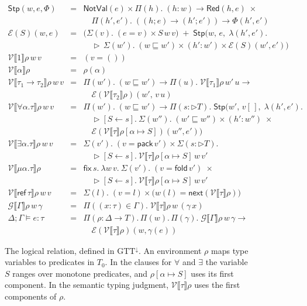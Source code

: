 \documentclass[acmsmall,nonacm,screen]{acmart}
\newcommand{\later}{{\triangleright}}
\newcommand{\nxt}{\mathsf{next}}
\newcommand{\fix}{\mathsf{fix}}
\newcommand{\sem}[1]{\llbracket #1 \rrbracket}
\newcommand{\kw}[1]{\mathsf{#1}}
\newcommand{\dsub}[2]{[#1 \leftarrow #2]}
\newcommand{\Pred}{T}
\newcommand{\Stp}{\mathsf{Stp}}
\newcommand{\Er}{\mathcal{E}}
\newcommand{\Vr}{\mathcal{V}}
\newcommand{\Gr}{\mathcal{G}}
\newcommand{\ext}{\sqsubseteq}
\begin{document}
\begin{figure}
\small
\[
\begin{array}{rcl}
\Stp(w,e,\Phi) & = & \kw{NotVal}(e) \times \Pi(h).\; (h : w) \to \kw{Red}(h,e) \;\times \\
 & & \quad \Pi(h',e').\; ((h;e) \longrightarrow (h';e')) \to \Phi(h',e') \\[4pt]
\Er(S)(w,e) & = & \bigl(\Sigma(v).\; (e = v) \times S\,w\,v\bigr) \;+\; \Stp\bigl(w,\,e,\;\lambda(h',e'). \\
 & & \quad \later\,\Sigma(w').\; (w \ext w') \times (h' : w') \times \Er(S)(w',e')\bigr) \\[6pt]
\Vr\sem{1}\rho\,w\,v & = & (v = ()) \\
\Vr\sem{\alpha}\rho & = & \rho(\alpha) \\
\Vr\sem{\tau_1 \to \tau_2}\rho\,w\,v & = &
   \Pi(w').\; (w \ext w') \to \Pi(u).\; \Vr\sem{\tau_1}\rho\,w'\,u \to \\
 & & \quad \Er(\Vr\sem{\tau_2}\rho)(w',\,v\,u) \\
\Vr\sem{\forall\alpha.\tau}\rho\,w\,v & = &
   \Pi(w').\; (w \ext w') \to \Pi(s : \later\Pred).\; \Stp\bigl(w',\,v[\,],\;\lambda(h',e'). \\
 & & \quad \later\dsub{S}{s}.\ \Sigma(w'').\; (w' \ext w'') \times (h' : w'') \;\times \\
 & & \quad \Er(\Vr\sem{\tau}\rho[\alpha \mapsto S])(w'',e')\bigr) \\
\Vr\sem{\exists\alpha.\tau}\rho\,w\,v & = &
   \Sigma(v').\; (v = \kw{pack}\,v') \times \Sigma(s : \later\Pred). \\
 & & \quad \later\dsub{S}{s}.\ \Vr\sem{\tau}\rho[\alpha \mapsto S]\,w\,v' \\
\Vr\sem{\mu\alpha.\tau}\rho & = &
   \fix\,s.\ \lambda w\,v.\ \Sigma(v').\; (v = \kw{fold}\,v') \;\times \\
 & & \quad \later\dsub{S}{s}.\ \Vr\sem{\tau}\rho[\alpha \mapsto S]\,w\,v' \\
\Vr\sem{\kw{ref}\,\tau}\rho\,w\,v & = &
   \Sigma(l).\; (v = l) \times \bigl(w(l) = \nxt(\Vr\sem{\tau}\rho)\bigr) \\[6pt]
\Gr\sem{\Gamma}\rho\,w\,\gamma & = & \Pi((x{:}\tau) \in \Gamma).\; \Vr\sem{\tau}\rho\,w\,(\gamma\,x) \\
\Delta;\Gamma \vDash e : \tau & = &
   \Pi(\rho : \Delta \to \Pred).\,\Pi(w).\,\Pi(\gamma).\; \Gr\sem{\Gamma}\rho\,w\,\gamma \to \\
 & & \quad \Er(\Vr\sem{\tau}\rho)(w,\gamma(e))
\end{array}
\]
\caption{The logical relation, defined in $\mathrm{GTT}^{\downarrow}$. An environment
$\rho$ maps type variables to predicates in $\Pred_0$. In the clauses for $\forall$ and
$\exists$ the variable $S$ ranges over monotone predicates, and $\rho[\alpha \mapsto S]$
uses its first component. In the semantic typing judgment, $\Vr\sem{\tau}\rho$ uses the
first components of $\rho$.}
\label{fig:lr}
\end{figure}
\end{document}
